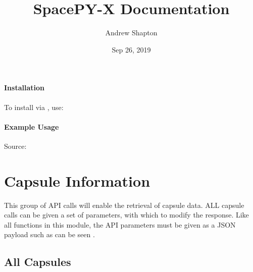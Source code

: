 \documentclass[letterpaper,10pt,english]{sphinxmanual}
\title{SpacePY-X Documentation}
\date{Sep 26, 2019}
\author{Andrew Shapton}
\begin{document}
\pagestyle{empty}
\sphinxmaketitle
\pagestyle{plain}
\sphinxtableofcontents
\pagestyle{normal}
\label{\detokenize{index::doc}}

\subsubsection*{Installation}

To install via , use:

\begin{sphinxVerbatim}[commandchars=\\\{\}]
   
\end{sphinxVerbatim}
\subsubsection*{Example Usage}

\begin{sphinxVerbatim}[commandchars=\\\{\}]
   

 

  
\end{sphinxVerbatim}

\noindent{}

Source:   


\chapter{Capsule Information}
\label{\detokenize{details/capsules:capsule-information}}\label{\detokenize{details/capsules::doc}}
This group of API calls will enable the retrieval of capsule data. ALL capsule calls can be given a set of parameters, with which to modify the response.
Like all functions in this module, the API parameters must be given as a JSON payload such as can be seen .


\section{All Capsules}
\label{\detokenize{details/capsules:all-capsules}}
\begin{sphinxVerbatim}[commandchars=\\\{\}]
  
\end{sphinxVerbatim}
\end{document}
